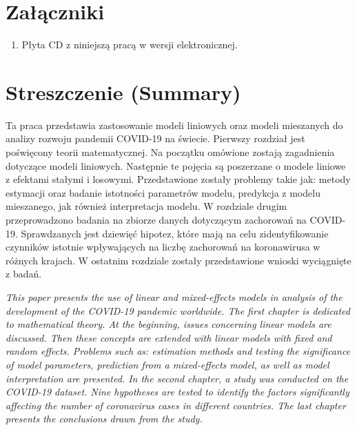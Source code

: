 \documentclass[12pt]{mwbk}
\theoremstyle{plain}
\theoremstyle{definition}
\theoremstyle{definition}
\begin{document}
\listoftables


\chapter*{Załączniki}
\begin{enumerate}
\item Płyta CD z niniejszą pracą w wersji elektronicznej.
\end{enumerate}




\chapter*{Streszczenie (Summary)}

\bigskip
\bigskip

\begin{center}
  \textbf{\tytul}
\end{center}

Ta praca przedstawia zastosowanie modeli liniowych oraz modeli mieszanych do analizy rozwoju pandemii COVID-19 na świecie. Pierwszy rozdział jest poświęcony teorii matematycznej. Na początku omówione zostają zagadnienia dotyczące modeli liniowych. Następnie te pojęcia są poszerzane o modele liniowe z efektami stałymi i losowymi. Przedstawione zostały problemy takie jak: metody estymacji oraz badanie istotności parametrów modelu, predykcja z modelu mieszanego, jak również interpretacja modelu. W rozdziale drugim przeprowadzono badania na zbiorze danych dotyczącym zachorowań na COVID-19. Sprawdzanych jest dziewięć hipotez, które mają na celu zidentyfikowanie czynników istotnie wpływających na liczbę zachorowań na koronawirusa w różnych krajach. W ostatnim rozdziale zostały przedstawione wnioski wyciągnięte z badań.


\bigskip

\begin{center}
  \textbf{\textit{\tytulangielski}}
\end{center}



{\it
This paper presents the use of linear and mixed-effects models in analysis of the development of the COVID-19 pandemic worldwide. The first chapter is dedicated to mathematical theory. At the beginning, issues concerning linear models are discussed. Then these concepts are extended with linear models with fixed and random effects. Problems such as: estimation methods and testing the significance of model parameters, prediction from a mixed-effects model, as well as model interpretation are presented. In the second chapter, a study was conducted on the COVID-19 dataset. Nine hypotheses are tested to identify the factors significantly affecting the number of coronavirus cases in different countries. The last chapter presents the conclusions drawn from the study.

}
\end{document}

